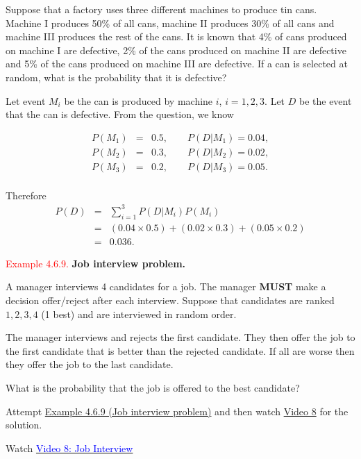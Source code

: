 \documentclass[
]{book}
\begin{document}
Suppose that a factory uses three different machines to produce tin cans. Machine I produces 50\% of all cans, machine II produces 30\% of all cans and machine III produces the rest of the cans. It is known that 4\% of cans produced on machine I are defective, 2\% of the cans produced on machine II are defective and 5\% of the cans produced on machine III are defective. If a can is selected at random, what is the probability that it is defective?

Let event \(M_i\) be the can is produced by machine \(i\), \(i=1,2,3\). Let \(D\) be the event that the can is defective. From the question, we know

\begin{eqnarray*}
P(M_1) &=& 0.5, \qquad P(D|M_1) = 0.04,\\
P(M_2) &=& 0.3, \qquad P(D|M_2) = 0.02,\\
P(M_3) &=& 0.2, \qquad P(D|M_3) = 0.05.\\
\end{eqnarray*}

Therefore\\

\begin{eqnarray*}
P(D) &=& \sum_{i=1}^3 P(D|M_i)P(M_i)\\
&=& (0.04 \times 0.5) + (0.02 \times 0.3) + (0.05 \times 0.2) \\
&=& 0.036.
\end{eqnarray*}

\hfill\break

\leavevmode{}%
\textcolor{red}{Example 4.6.9.}
{\textbf{Job interview problem.}}

A manager interviews 4 candidates for a job. The manager \textbf{MUST} make a decision offer/reject
after each interview. Suppose that candidates are ranked \(1,2,3,4\) (1 best) and are
interviewed in random order.

The manager interviews and rejects the first candidate. They then offer the job to
the first candidate that is better than the rejected candidate. If all are worse
then they offer the job to the last candidate.

What is the probability that the job is offered to the best candidate?

Attempt \protect\hyperlink{prob:job_interview}{Example 4.6.9 (Job interview problem)} and then watch \protect\hyperlink{video8}{Video 8} for the solution.

Watch \href{https://mediaspace.nottingham.ac.uk/media/Job+Interview+FINAL+VERSION/1_nzxxre7o}{\textcolor{blue}{Video 8: Job Interview}}
\end{document}
